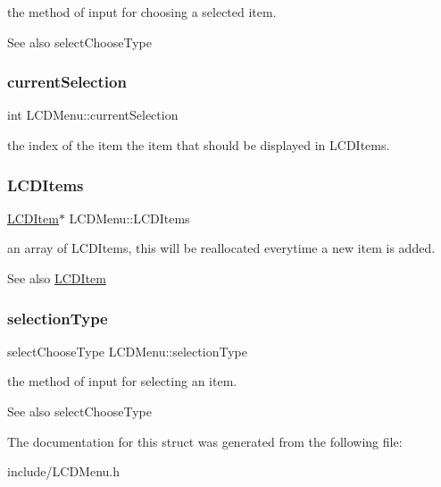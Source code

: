the method of input for choosing a selected item.

\begin{DoxySeeAlso}{See also}
select\+Choose\+Type 
\end{DoxySeeAlso}
\hypertarget{structLCDMenu_a1f55c3e181f20c796ec51e74b70887f7}{}\label{structLCDMenu_a1f55c3e181f20c796ec51e74b70887f7} 
\subsubsection{\texorpdfstring{current\+Selection}{currentSelection}}
{\footnotesize\ttfamily int L\+C\+D\+Menu\+::current\+Selection}

the index of the item the item that should be displayed in L\+C\+D\+Items. \hypertarget{structLCDMenu_a5062cf64656db6299e699dcdacd1ba85}{}\label{structLCDMenu_a5062cf64656db6299e699dcdacd1ba85} 
\subsubsection{\texorpdfstring{L\+C\+D\+Items}{LCDItems}}
{\footnotesize\ttfamily \hyperlink{structLCDItem}{L\+C\+D\+Item}$\ast$ L\+C\+D\+Menu\+::\+L\+C\+D\+Items}

an array of L\+C\+D\+Items, this will be reallocated everytime a new item is added.

\begin{DoxySeeAlso}{See also}
\hyperlink{structLCDItem}{L\+C\+D\+Item} 
\end{DoxySeeAlso}
\hypertarget{structLCDMenu_ad6a65fea09794de97086121d7b72a2ac}{}\label{structLCDMenu_ad6a65fea09794de97086121d7b72a2ac} 
\subsubsection{\texorpdfstring{selection\+Type}{selectionType}}
{\footnotesize\ttfamily select\+Choose\+Type L\+C\+D\+Menu\+::selection\+Type}

the method of input for selecting an item.

\begin{DoxySeeAlso}{See also}
select\+Choose\+Type 
\end{DoxySeeAlso}


The documentation for this struct was generated from the following file\+:\begin{DoxyCompactItemize}
\item 
include/L\+C\+D\+Menu.\+h\end{DoxyCompactItemize}
